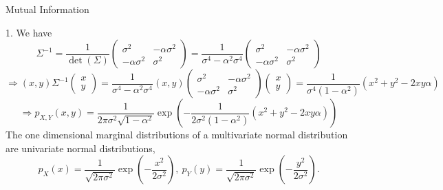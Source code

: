 \documentclass[english]{exercisesheet}
\begin{document}
 
\begin{nexercise}{Mutual Information}
\end{nexercise}
\begin{solution}
 1. We have
 \begin{equation*}
  \Sigma^{-1}=\frac{1}{\det(\Sigma)} \begin{pmatrix}
                                    \sigma^2&-\alpha\sigma^2\\
                                      -\alpha\sigma^2& \sigma^2
                                     \end{pmatrix}
    =\frac{1}{\sigma^4-\alpha^2\sigma^4} \begin{pmatrix}
                                    \sigma^2&-\alpha\sigma^2\\
                                      -\alpha\sigma^2& \sigma^2
                                     \end{pmatrix}
 \end{equation*}
\begin{equation*}
 \Rightarrow (x,y)
             \Sigma^{-1}\begin{pmatrix}
                         x\\y
                        \end{pmatrix}
=\frac{1}{\sigma^4-\alpha^2\sigma^4} (x,y)\begin{pmatrix}
                                    \sigma^2&-\alpha\sigma^2\\
                                      -\alpha\sigma^2& \sigma^2
                                     \end{pmatrix}\begin{pmatrix}
                                     x\\y
                                     \end{pmatrix}
=\frac{1}{\sigma^4(1-\alpha^2)}(x^2+y^2-2xy\alpha)
\end{equation*}
\begin{equation*}
 \Rightarrow p_{X,Y}(x,y)=\frac{1}{2\pi\sigma^2\sqrt{1-\alpha^2}}\exp\left(-\frac{1}{2\sigma^2(1-\alpha^2)}(x^2+y^2-2xy\alpha)\right)
\end{equation*}
The one dimensional marginal distributions of a multivariate normal distribution are univariate normal distributions,
\begin{equation*}
 p_X(x)=\frac{1}{\sqrt{2\pi\sigma^2}}\exp\left(-\frac{x^2}{2\sigma^2}\right),~p_Y(y)=\frac{1}{\sqrt{2\pi\sigma^2}}\exp\left(-\frac{y^2}{2\sigma^2}\right).

\end{equation*}
\end{solution}
\end{document}
